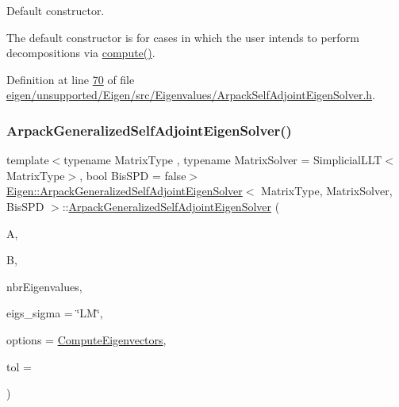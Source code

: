 Default constructor. 

The default constructor is for cases in which the user intends to perform decompositions via \hyperlink{class_eigen_1_1_arpack_generalized_self_adjoint_eigen_solver_a1a905e5e65e82e559a2cc394a9f42385}{compute()}. 

Definition at line \hyperlink{eigen_2unsupported_2_eigen_2src_2_eigenvalues_2_arpack_self_adjoint_eigen_solver_8h_source_l00070}{70} of file \hyperlink{eigen_2unsupported_2_eigen_2src_2_eigenvalues_2_arpack_self_adjoint_eigen_solver_8h_source}{eigen/unsupported/\+Eigen/src/\+Eigenvalues/\+Arpack\+Self\+Adjoint\+Eigen\+Solver.\+h}.

\mbox{\label{class_eigen_1_1_arpack_generalized_self_adjoint_eigen_solver_ab67d6c5218fd84e74fc03d55acd0c89e}} 
\subsubsection{\texorpdfstring{Arpack\+Generalized\+Self\+Adjoint\+Eigen\+Solver()}{ArpackGeneralizedSelfAdjointEigenSolver()}\hspace{0.1cm}{\footnotesize\ttfamily [2/6]}}
{\footnotesize\ttfamily template$<$typename Matrix\+Type , typename Matrix\+Solver  = Simplicial\+L\+L\+T$<$\+Matrix\+Type$>$, bool Bis\+S\+PD = false$>$ \\
\hyperlink{class_eigen_1_1_arpack_generalized_self_adjoint_eigen_solver}{Eigen\+::\+Arpack\+Generalized\+Self\+Adjoint\+Eigen\+Solver}$<$ Matrix\+Type, Matrix\+Solver, Bis\+S\+PD $>$\+::\hyperlink{class_eigen_1_1_arpack_generalized_self_adjoint_eigen_solver}{Arpack\+Generalized\+Self\+Adjoint\+Eigen\+Solver} (\begin{DoxyParamCaption}\item[{const Matrix\+Type \&}]{A,  }\item[{const Matrix\+Type \&}]{B,  }\item[{Index}]{nbr\+Eigenvalues,  }\item[{std\+::string}]{eigs\+\_\+sigma = {\ttfamily \char`\"{}LM\char`\"{}},  }\item[{int}]{options = {\ttfamily \hyperlink{group__enums_ggae3e239fb70022eb8747994cf5d68b4a9ada93d8885bde32b876ba4af01d3292cc}{Compute\+Eigenvectors}},  }\item[{\hyperlink{class_eigen_1_1_arpack_generalized_self_adjoint_eigen_solver_a2555af55e53bf9de894a49e639be2e1e}{Real\+Scalar}}]{tol = {} }\end{DoxyParamCaption})\hspace{0.3cm}{\ttfamily [inline]}}



